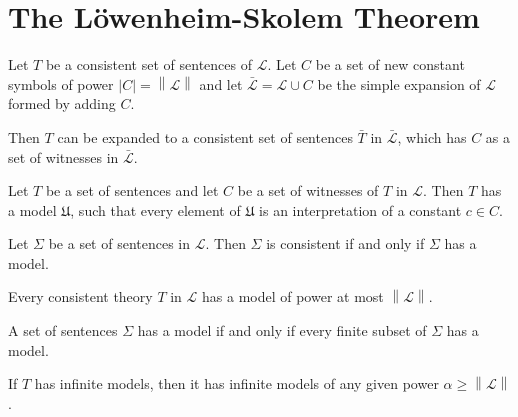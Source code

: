 \documentclass[../../main.tex]{subfiles}
\begin{document}
\section{The Löwenheim-Skolem Theorem}

\begin{lemma}\cite[Lemma 2.1.1]{Cha90}
    Let $T$ be a consistent set of sentences of $\mathcal{L}$.  
    Let $C$ be a set of new constant symbols of power $\left\lvert C \right\rvert = \left\lVert \mathcal{L} \right\rVert$
     and let $\bar{\mathcal{L}} = \mathcal{L} \cup C$ be the simple expansion of $\mathcal{L}$ formed by adding $C$.
    
    Then $T$ can be expanded to a consistent set of sentences $\bar{T}$ in $\bar{\mathcal{L}}$, which has $C$ as a set of witnesses in $\bar{\mathcal{L}}$.
\end{lemma}

\begin{lemma}\cite[Lemma 2.1.2]{Cha90}
    Let $T$ be a set of sentences and let $C$ be a set of witnesses of $T$ in $\mathcal{L}$.
    Then $T$ has a model $\mathfrak{U}$, such that every element of $\mathfrak{U}$ is an interpretation of a constant $c \in C$.
\end{lemma} 

\begin{theorem}\cite[Theorem 1.3.21]{Cha90}
    Let $\Sigma$ be a set of sentences in $\mathcal{L}$.
    Then $\Sigma$ is consistent if and only if $\Sigma$ has a model.
\end{theorem}

\begin{theorem}\label{down-lowenheim-skolem}\cite[Corollary 2.1.4]{Cha90}
    Every consistent theory $T$ in $\mathcal{L}$ has a model of power at most $\left\lVert \mathcal{L} \right\rVert$.
\end{theorem}

\begin{theorem}\cite[Theorem 1.3.22]{Cha90}
    A set of sentences $\Sigma$ has a model if and only if every finite subset of $\Sigma$ has a model.
\end{theorem}

\begin{theorem}\label{up-lowenheim-skolem}\cite[Corollary 2.1.6]{Cha90}
    If $T$ has infinite models, then it has infinite models of any given power $\alpha \geq \left\lVert \mathcal{L} \right\rVert$.
\end{theorem}
\end{document}
